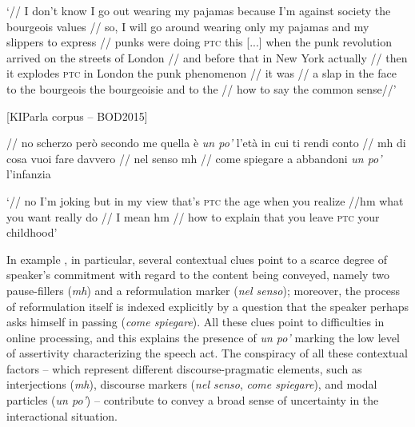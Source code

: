 \glt ‘// I don’t know I go out wearing my pajamas because I’m against society the bourgeois values // so, I will go around wearing only my pajamas and my slippers to express // punks were doing \textsc{ptc} this [...] when the punk revolution arrived on the streets of London // and before that in New York actually // then it explodes \textsc{ptc} in London the punk phenomenon // it was // a slap in the face to the bourgeois the bourgeoisie and to the // how to say the common sense//’
    \z %

\ea%
    \label{ex:key:79}

          [KIParla corpus – BOD2015]

// no scherzo però secondo me quella è \textit{un po’} l’età in cui ti rendi conto // mh di cosa vuoi fare davvero // nel senso mh // come spiegare a abbandoni \textit{un po’} l’infanzia

\glt ‘// no I’m joking but in my view that’s \textsc{ptc} the age when you realize //hm what you want really do // I mean hm // how to explain that you leave \textsc{ptc} your childhood’
    \z %

In example , in particular, several contextual clues point to a scarce degree of speaker’s commitment with regard to the content being conveyed, namely two pause-fillers (\textit{mh}) and a reformulation marker (\textit{nel senso}); moreover, the process of reformulation itself is indexed explicitly by a question that the speaker perhaps asks himself in passing (\textit{come spiegare}). All these clues point to difficulties in online processing, and this explains the presence of \textit{un po’} marking the low level of assertivity characterizing the speech act. The conspiracy of all these contextual factors – which represent different discourse-pragmatic elements, such as interjections (\textit{mh}), discourse markers (\textit{nel senso}, \textit{come spiegare}), and modal particles (\textit{un po’}) – contribute to convey a broad sense of uncertainty in the interactional situation.

